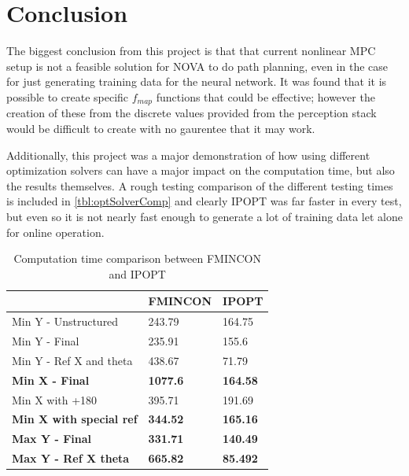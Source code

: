 \documentclass[]{IEEEtran}
\begin{document}
\section{Conclusion}
The biggest conclusion from this project is that that current nonlinear MPC setup is not a feasible solution for NOVA to do path planning, even in the case for just generating training data for the neural network.
It was found that it is possible to create specific $f_{map}$ functions that could be effective; however the creation of these from the discrete values provided from the perception stack would be difficult to create with no gaurentee that it may work.

Additionally, this project was a major demonstration of how using different optimization solvers can have a major impact on the computation time, but also the results themselves.
A rough testing comparison of the different testing times is included in \autoref{tbl:optSolverComp} and clearly IPOPT was far faster in every test, but even so it is not nearly fast enough to generate a lot of training data let alone for online operation.

\begin{table}[h]
    \centering
    \caption{Computation time comparison between FMINCON and IPOPT}\label{tbl:optSolverComp}
    \begin{tabular}{|l|l|l|}
		\hline
		\textbf{}                       & \textbf{FMINCON} & \textbf{IPOPT}  \\ \hline
		Min Y - Unstructured            & 243.79           & 164.75          \\ \hline
		Min Y - Final                   & 235.91           & 155.6           \\ \hline
		Min Y - Ref X and theta         & 438.67           & 71.79           \\ \hline
		\textbf{Min X - Final}          & \textbf{1077.6}  & \textbf{164.58} \\ \hline
		Min X with +180                 & 395.71           & 191.69          \\ \hline
		\textbf{Min X with special ref} & \textbf{344.52}  & \textbf{165.16} \\ \hline
		\textbf{Max Y - Final}          & \textbf{331.71}  & \textbf{140.49} \\ \hline
		\textbf{Max Y - Ref X theta}    & \textbf{665.82}  & \textbf{85.492} \\ \hline
    \end{tabular}
\end{table}
\end{document}
